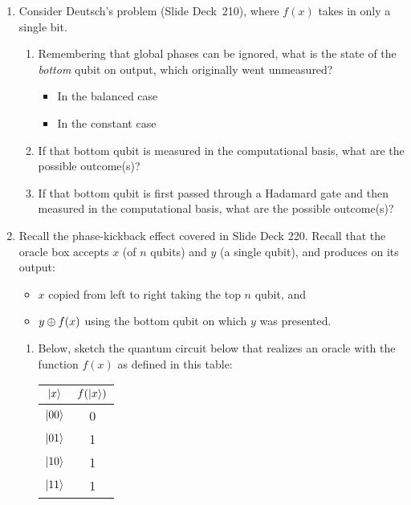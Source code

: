 \documentclass[12pt]{article}
\begin{document}
\begin{enumerate}[font=\bfseries]
    \item{} Consider Deutsch's problem (Slide Deck~210), where $f(x)$ takes in only a single bit.
    \begin{enumerate}[label=\theenumi.\arabic*]
        \item Remembering that global phases can be ignored, what is the state of the \emph{bottom} qubit on output, which originally went unmeasured?
        \begin{itemize}
            \item In the balanced case \Blank{}
            \item In the constant case
            \Blank{}
        \end{itemize}
        \item If that bottom qubit is measured in the computational basis, what are the possible outcome(s)? \Blank{}
        \item If that bottom qubit is first passed through a Hadamard gate and then measured in the computational basis, what are the possible outcome(s)?\Blank{}
    \end{enumerate}
    \item{} Recall the phase-kickback effect covered in Slide Deck 220.  Recall that the oracle box accepts $x$ (of $n$ qubits) and $y$ (a single qubit), and produces on its output:
    \begin{itemize}
        \item $x$ copied from left to right taking the top $n$ qubit, and
        \item $y\oplus f(x)$ using the bottom qubit on which $y$ was presented.
    \end{itemize}
    \begin{enumerate}[label=\theenumi.\arabic*]
        \item Below, sketch the quantum circuit below that realizes an oracle with the function $f(x)$ as defined in this table:
        \begin{center}
            \begin{tabular}{c|c}
                 $\ket{x}$&$f(\ket{x})$  \\\hline
                 $\ket{00}$ & 0 \\
                 $\ket{01}$ & 1 \\
                 $\ket{10}$ & 1 \\
                 $\ket{11}$ & 1 \\

\end{tabular}
\end{center}
\end{enumerate}
\end{enumerate}
\end{document}
